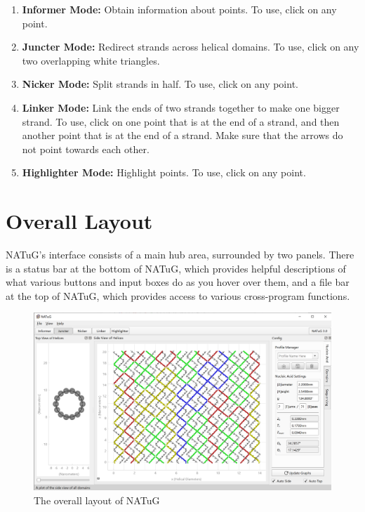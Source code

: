 \documentclass[titlepage]{article}
\begin{document}
	\begin{enumerate}
		\item \textbf{Informer Mode:} Obtain information about points. To use, click on any point.
		\item \textbf{Juncter Mode:} Redirect strands across helical domains. To use, click on any two overlapping white triangles.
		\item \textbf{Nicker Mode:} Split strands in half. To use, click on any point.
		\item \textbf{Linker Mode:} Link the ends of two strands together to make one bigger strand. To use, click on one point that is at the end of a strand, and then another point that is at the end of a strand. Make sure that the arrows do not point towards each other.
		\item \textbf{Highlighter Mode:} Highlight points. To use, click on any point.
	\end{enumerate}

	\section{Overall Layout}
	
	NATuG’s interface consists of a main hub area, surrounded by two panels. There is a status bar at the bottom of NATuG, which provides helpful descriptions of what various buttons and input boxes do as you hover over them, and a file bar at the top of NATuG, which provides access to various cross-program functions.
	
	\begin{figure}[h]
		\centering
		\caption{The overall layout of NATuG}
		\label{program-layout}
		\includegraphics[width=5in]{program-layout.png}
	\end{figure}
\end{document}
